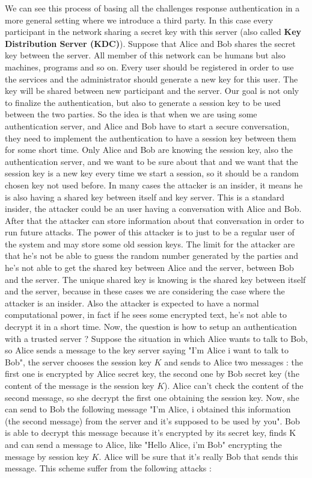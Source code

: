 \documentclass[11pt]{article}
\begin{document}
We can see this process of basing all the challenges response authentication in a more general setting where we introduce a third party. In this case every participant in the network sharing a secret key with this server (also called \textbf{Key Distribution Server (KDC)}). Suppose that Alice and Bob shares the secret key between the server. All member of this network can be humans but also machines, programs and so on. Every user should be registered in order to use the services and the administrator should generate a new key for this user. The key will be shared between new participant and the server. Our goal is not only to finalize the authentication, but also to generate a session key to be used between the two parties. So the idea is that when we are using some authentication server, and Alice and Bob have to start a secure conversation, they need to implement the authentication to have a session key between them for some short time. Only Alice and Bob are knowing the session key, also the authentication server, and we want to be sure about that and we want that the session key is a new key every time we start a session, so it should be a random chosen key not used before. In many cases the attacker is an insider, it means he is also having a shared key between itself and key server. This is a standard insider, the attacker could be an user having a conversation with Alice and Bob. After that the attacker can store information about that conversation in order to run future attacks. The power of this attacker is to just to be a regular user of the system and may store some old session keys. The limit for the attacker are that he's not be able to guess the random number generated by the parties and he's not able to get the shared key between Alice and the server, between Bob and the server. The unique shared key is knowing is the shared key between itself and the server, because in these cases we are considering the case where the attacker is an insider. Also the attacker is expected to have a normal computational power, in fact if he sees some encrypted text, he's not able to decrypt it in a short time. Now, the question is how to setup an authentication with a trusted server ? Suppose the situation in which Alice wants to talk to Bob, so Alice sends a message to the key server saying "I'm Alice i want to talk to Bob", the server chooses the session key $K$ and sends to Alice two messages : the first one is encrypted by Alice secret key, the second one by Bob secret key (the content of the message is the session key $K$). Alice can't check the content of the second message, so she decrypt the first one obtaining the session key. Now, she can send to Bob the following message "I'm Alice, i obtained this information (the second message) from the server and it's supposed to be used by you". Bob is able to decrypt this message because it's encrypted by its secret key, finds K and can send a message to Alice, like "Hello Alice, i'm Bob" encrypting the message by session key $K$. Alice will be sure that it's really Bob that sends this message. This scheme suffer from the following attacks : 
\end{document}
